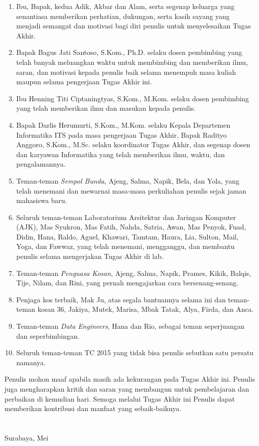 \begin{enumerate}
	\item Ibu, Bapak, kedua Adik, Akbar dan Alam, serta segenap keluarga yang senantiasa memberikan perhatian, dukungan, serta kasih sayang yang menjadi semangat dan motivasi bagi diri penulis untuk menyelesaikan Tugas Akhir.
	\item Bapak Bagus Jati Santoso, S.Kom., Ph.D. selaku dosen pembimbing yang telah banyak meluangkan waktu untuk membimbing dan memberikan ilmu, saran, dan motivasi kepada penulis baik selama menempuh masa kuliah maupun selama pengerjaan Tugas Akhir ini.
	\item Ibu Henning Titi Ciptaningtyas, S.Kom., M.Kom. selaku dosen pembimbing yang telah memberikan ilmu dan masukan kepada penulis.
	\item Bapak Darlis Herumurti, S.Kom., M.Kom. selaku Kepala Departemen Informatika ITS pada masa pengerjaan Tugas Akhir, Bapak Radityo Anggoro, S.Kom., M.Sc. selaku koordinator Tugas Akhir, dan segenap dosen dan karyawan Informatika yang telah memberikan ilmu, waktu, dan pengalamannya.
	\item Teman-teman \textit{Sempol Bunda}, Ajeng, Salma, Napik, Bela, dan Yola, yang telah menemani dan mewarnai masa-masa perkuliahan penulis sejak jaman mahasiswa baru.
	\item Seluruh teman-teman Laboratorium Arsitektur dan Jaringan Komputer (AJK), Mas Syukron, Mas Fatih, Nahda, Satria, Awan, Mas Penyok, Fuad, Didin, Hana, Raldo, Aguel, Khawari, Tamtam, Haura, Lia, Sulton, Mail, Yoga, dan Fawwaz, yang telah menemani, mengganggu, dan membantu penulis selama mengerjakan Tugas Akhir di lab.
	\item Teman-teman \textit{Penguasa Kosan}, Ajeng, Salma, Napik, Prames, Kikik, Balqis, Tije, Nilam, dan Rini, yang pernah mengajarkan cara bersenang-senang. 
	\item Penjaga kos terbaik, Mak Ju, atas segala bantuannya selama ini dan teman-teman kosan 36, Jakiya, Mutek, Marisa, Mbak Tatak, Alya, Firda, dan Anca.
	\item Teman-teman \textit{Data Engineers}, Hana dan Rio, sebagai teman seperjuangan dan seperbimbingan.
	\item Seluruh teman-teman TC 2015 yang tidak bisa penulis sebutkan satu persatu namanya.
\end{enumerate}

Penulis mohon maaf apabila masih ada kekurangan pada Tugas Akhir ini. Penulis juga mengharapkan kritik dan saran yang membangun untuk pembelajaran dan perbaikan di kemudian hari. Semoga melalui Tugas Akhir ini Penulis dapat memberikan kontribusi dan manfaat yang sebaik-baiknya. \\ \\ \\

\hfill Surabaya, Mei \tahun \\ \\ \\

\hfill \penulis \\
\cleardoublepage

